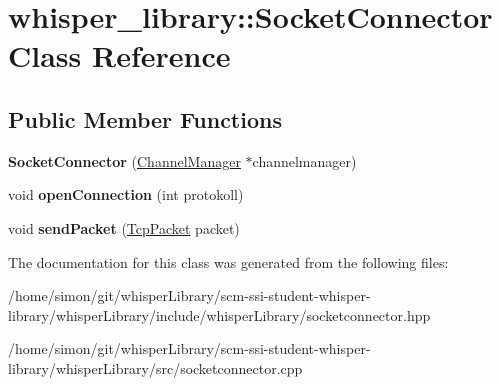 \hypertarget{classwhisper__library_1_1SocketConnector}{\section{whisper\-\_\-library\-:\-:\-Socket\-Connector \-Class \-Reference}
\label{classwhisper__library_1_1SocketConnector}
}
\subsection*{\-Public \-Member \-Functions}
\begin{DoxyCompactItemize}
\item 
\hypertarget{classwhisper__library_1_1SocketConnector_ae8a048f5901599ca18312021e6773b38}{{\bfseries \-Socket\-Connector} (\hyperlink{classwhisper__library_1_1ChannelManager}{\-Channel\-Manager} $\ast$channelmanager)}\label{classwhisper__library_1_1SocketConnector_ae8a048f5901599ca18312021e6773b38}

\item 
\hypertarget{classwhisper__library_1_1SocketConnector_a97e6286b861e729d280795e0ad7d1553}{void {\bfseries open\-Connection} (int protokoll)}\label{classwhisper__library_1_1SocketConnector_a97e6286b861e729d280795e0ad7d1553}

\item 
\hypertarget{classwhisper__library_1_1SocketConnector_a3fb19551309ebc3a14c4d43d6fca17df}{void {\bfseries send\-Packet} (\hyperlink{classwhisper__library_1_1TcpPacket}{\-Tcp\-Packet} packet)}\label{classwhisper__library_1_1SocketConnector_a3fb19551309ebc3a14c4d43d6fca17df}

\end{DoxyCompactItemize}


\-The documentation for this class was generated from the following files\-:\begin{DoxyCompactItemize}
\item 
/home/simon/git/whisper\-Library/scm-\/ssi-\/student-\/whisper-\/library/whisper\-Library/include/whisper\-Library/socketconnector.\-hpp\item 
/home/simon/git/whisper\-Library/scm-\/ssi-\/student-\/whisper-\/library/whisper\-Library/src/socketconnector.\-cpp\end{DoxyCompactItemize}
